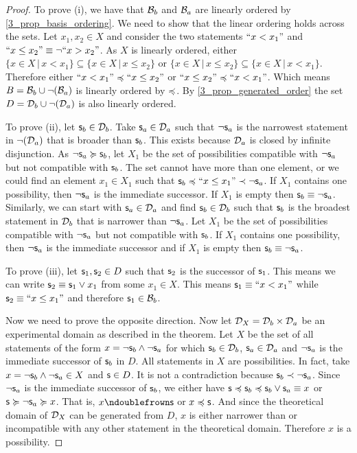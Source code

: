 \documentclass[11pt,letterpaper,fleqn]{memoir} %
\begin{document}
\begin{mathSection}
\begin{proof}
	To prove (i), we have that $\mathcal{B}_b$ and $\mathcal{B}_a$ are linearly ordered by \ref{3_prop_basis_ordering}. We need to show that the linear ordering holds across the sets. Let $x_1, x_2 \in X$ and consider the two statements $``x < x_1"$ and $``x \leq x_2"\equiv \neg ``x > x_2"$. As $X$ is linearly ordered, either $\{x \in X \, | \, x < x_1\} \subseteq \{x \in X \, | \, x \leq x_2\}$ or $\{x \in X \, | \, x \leq x_2\} \subseteq \{x \in X \, | \, x < x_1\}$. Therefore either $``x < x_1" \preccurlyeq ``x \leq x_2"$ or $``x \leq x_2" \preccurlyeq ``x < x_1"$. Which means $B = \mathcal{B}_b \cup \neg(\mathcal{B}_a)$ is linearly ordered by $\preccurlyeq$. By \ref{3_prop_generated_order} the set $D = \mathcal{D}_b \cup \neg(\mathcal{D}_a)$ is also linearly ordered.

	To prove (ii), let $\mathsf{s}_b \in \mathcal{D}_b$. Take $\mathsf{s}_a \in \mathcal{D}_a$ such that $\neg \mathsf{s}_a$ is the narrowest statement in $\neg (\mathcal{D}_a)$ that is broader than $\mathsf{s}_b$. This exists because $\mathcal{D}_a$ is closed by infinite disjunction. As $\neg \mathsf{s}_a \succcurlyeq \mathsf{s}_b$, let $X_1$ be the set of possibilities compatible with $\neg \mathsf{s}_a$ but not compatible with $\mathsf{s}_b$. The set cannot have more than one element, or we could find an element $x_1 \in X_1$ such that $\mathsf{s}_b \preccurlyeq ``x \leq x_1" \prec \neg \mathsf{s}_a$. If $X_1$ contains one possibility, then $\neg \mathsf{s}_a$ is the immediate successor. If $X_1$ is empty then $\mathsf{s}_b \equiv \neg \mathsf{s}_a$. Similarly, we can start with $\mathsf{s}_a \in \mathcal{D}_a$ and find $\mathsf{s}_b \in \mathcal{D}_b$ such that $\mathsf{s}_b$ is the broadest statement in $\mathcal{D}_b$ that is narrower than $\neg \mathsf{s}_a$. Let $X_1$ be the set of possibilities compatible with $\neg \mathsf{s}_a$ but not compatible with $\mathsf{s}_b$. If $X_1$ contains one possibility, then $\neg \mathsf{s}_a$ is the immediate successor and if $X_1$ is empty then $\mathsf{s}_b \equiv \neg \mathsf{s}_a$.
	
	To prove (iii), let $\mathsf{s}_1, \mathsf{s}_2 \in D$ such that $\mathsf{s}_2$ is the successor of $\mathsf{s}_1$. This means we can write $\mathsf{s}_2 \equiv \mathsf{s}_1 \vee x_1$ from some $x_1 \in X$. This means $\mathsf{s}_1 \equiv ``x < x_1"$ while $\mathsf{s}_2 \equiv ``x \leq x_1"$ and therefore $\mathsf{s}_1 \in \mathcal{B}_b$.
	
	Now we need to prove the opposite direction. Now let $\mathcal{D}_X = \mathcal{D}_b \times \mathcal{D}_a$ be an experimental domain as described in the theorem. Let $X$ be the set of all statements of the form $x = \neg \mathsf{s}_b \wedge \neg \mathsf{s}_a$ for which $\mathsf{s}_b \in \mathcal{D}_b$, $\mathsf{s}_a \in \mathcal{D}_a$ and $\neg \mathsf{s}_a$ is the immediate successor of $\mathsf{s}_b$ in $D$. All statements in $X$ are possibilities. In fact, take $x = \neg \mathsf{s}_b \wedge \neg \mathsf{s}_a \in X$ and $\mathsf{s} \in D$. It is not a contradiction because $\mathsf{s}_b \prec \neg \mathsf{s}_a$. Since $\neg \mathsf{s}_a$ is the immediate successor of $\mathsf{s}_b$, we either have $\mathsf{s} \preccurlyeq \mathsf{s}_b \preccurlyeq \mathsf{s}_b \vee \mathsf{s}_a \equiv x$ or $\mathsf{s} \succcurlyeq \neg \mathsf{s}_a \succcurlyeq x$. That is, $x \ncomp \stmt$ or $x \preccurlyeq \mathsf{s}$. And since the theoretical domain of $\mathcal{D}_X$ can be generated from $D$, $x$ is either narrower than or incompatible with any other statement in the theoretical domain. Therefore $x$ is a possibility.
	

\end{proof}
\end{mathSection}
\end{document}
